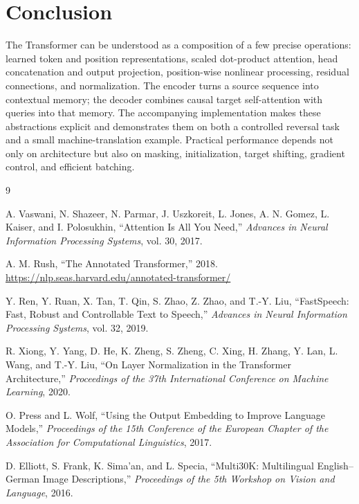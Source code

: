 \documentclass[11pt]{article}
\begin{document}
\section{Conclusion}

The Transformer can be understood as a composition of a few precise operations: learned token and position representations, scaled dot-product attention, head concatenation and output projection, position-wise nonlinear processing, residual connections, and normalization. The encoder turns a source sequence into contextual memory; the decoder combines causal target self-attention with queries into that memory. The accompanying implementation makes these abstractions explicit and demonstrates them on both a controlled reversal task and a small machine-translation example. Practical performance depends not only on architecture but also on masking, initialization, target shifting, gradient control, and efficient batching.

\begin{thebibliography}{9}

A. Vaswani, N. Shazeer, N. Parmar, J. Uszkoreit, L. Jones,
A. N. Gomez, L. Kaiser, and I. Polosukhin,
``Attention Is All You Need,''
\emph{Advances in Neural Information Processing Systems}, vol. 30, 2017.

A. M. Rush,
``The Annotated Transformer,'' 2018.
\url{https://nlp.seas.harvard.edu/annotated-transformer/}

Y. Ren, Y. Ruan, X. Tan, T. Qin, S. Zhao, Z. Zhao, and T.-Y. Liu,
``FastSpeech: Fast, Robust and Controllable Text to Speech,''
\emph{Advances in Neural Information Processing Systems}, vol. 32, 2019.

R. Xiong, Y. Yang, D. He, K. Zheng, S. Zheng, C. Xing,
H. Zhang, Y. Lan, L. Wang, and T.-Y. Liu,
``On Layer Normalization in the Transformer Architecture,''
\emph{Proceedings of the 37th International Conference on Machine Learning}, 2020.

O. Press and L. Wolf,
``Using the Output Embedding to Improve Language Models,''
\emph{Proceedings of the 15th Conference of the European Chapter of the Association for Computational Linguistics}, 2017.

D. Elliott, S. Frank, K. Sima'an, and L. Specia,
``Multi30K: Multilingual English--German Image Descriptions,''
\emph{Proceedings of the 5th Workshop on Vision and Language}, 2016.

\end{thebibliography}
\end{document}
